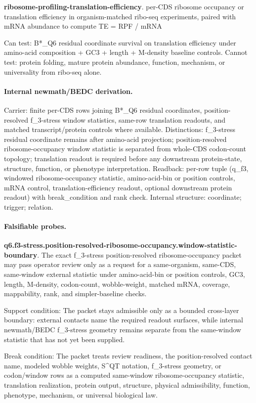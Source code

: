 \textbf{ribosome-profiling-translation-efficiency}. per-CDS ribosome occupancy or translation efficiency in organism-matched ribo-seq experiments, paired with mRNA abundance to compute TE = RPF / mRNA

Can test: B*\_Q6 residual coordinate survival on translation efficiency under amino-acid composition + GC3 + length + M-density baseline controls. Cannot test: protein folding, mature protein abundance, function, mechanism, or universality from ribo-seq alone.

\paragraph{Internal newmath/BEDC derivation.} Carrier: finite per-CDS rows joining B*\_Q6 residual coordinates, position-resolved f\_3-stress window statistics, same-row translation readouts, and matched transcript/protein controls where available. Distinctions: f\_3-stress residual coordinate remains after amino-acid projection; position-resolved ribosome-occupancy window statistic is separated from whole-CDS codon-count topology; translation readout is required before any downstream protein-state, structure, function, or phenotype interpretation. Readback: per-row tuple (q\_f3, windowed ribosome-occupancy statistic, amino-acid-bin or position controls, mRNA control, translation-efficiency readout, optional downstream protein readout) with break\_condition and rank check. Internal structure: coordinate; trigger; relation.

\paragraph{Falsifiable probes.}
\textbf{q6.f3-stress.position-resolved-ribosome-occupancy.window-statistic-boundary}. The exact f\_3-stress position-resolved ribosome-occupancy packet may pass operator review only as a request for a same-organism, same-CDS, same-window external statistic under amino-acid-bin or position controls, GC3, length, M-density, codon-count, wobble-weight, matched mRNA, coverage, mappability, rank, and simpler-baseline checks.

Support condition: The packet stays admissible only as a bounded cross-layer boundary: external contacts name the required readout surfaces, while internal newmath/BEDC f\_3-stress geometry remains separate from the same-window statistic that has not yet been supplied.

Break condition: The packet treats review readiness, the position-resolved contact name, modeled wobble weights, S\textasciicircum{}QT notation, f\_3-stress geometry, or codon/window rows as a computed same-window ribosome-occupancy statistic, translation realization, protein output, structure, physical admissibility, function, phenotype, mechanism, or universal biological law.

